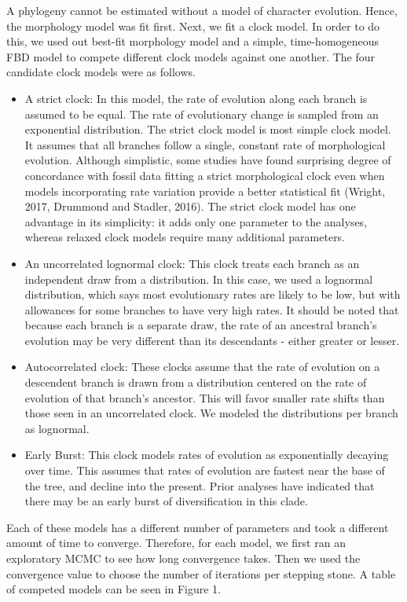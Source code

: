 \documentclass{article}
\begin{document}
A phylogeny cannot be estimated without a model of character evolution. 
Hence, the morphology model was fit first.
Next, we fit a clock model. 
In order to do this, we used out best-fit morphology model and a simple, time-homogeneous FBD model to compete different clock models against one another.
The four candidate clock models were as follows.
\begin{itemize}
    \item A strict clock: In this model, the rate of evolution along each branch is assumed to be equal. The rate of evolutionary change is sampled from an exponential distribution. 
    The strict clock model is most simple clock model. 
    It assumes that all branches follow a single, constant rate of morphological evolution. 
    Although simplistic, some studies have found surprising degree of concordance with fossil data fitting a strict morphological clock even when models incorporating rate variation provide a better statistical fit (Wright, 2017, Drummond and Stadler, 2016). 
    The strict clock model has one advantage in its simplicity: it adds only one parameter to the analyses, whereas relaxed clock models require many additional parameters.
    \item An uncorrelated lognormal clock: This clock treats each branch as an independent draw from a distribution.  
    In this case, we used a lognormal distribution, which says most evolutionary rates are likely to be low, but with allowances for some branches to have very high rates. 
    It should be noted that because each branch is a separate draw, the rate of an ancestral branch's evolution may be very different than its descendants - either greater or lesser.
    \item Autocorrelated clock: These clocks assume that the rate of evolution on a descendent branch is drawn from a distribution centered on the rate of evolution of that branch's ancestor. 
    This will favor smaller rate shifts than those seen in an uncorrelated clock. We modeled the distributions per branch as lognormal.
    \item Early Burst: This clock models rates of evolution as exponentially decaying over time. 
    This assumes that rates of evolution are fastest near the base of the tree, and decline into the present. Prior analyses have indicated that there may be an early burst of diversification in this clade. \citep{Pete, was this your idea?}
\end{itemize}

Each of these models has a different number of parameters and took a different amount of time to converge. Therefore, for each model, we first ran an exploratory MCMC to see how long convergence takes. Then we used the convergence value to choose the number of iterations per stepping stone.
A table of competed models can be seen in Figure 1.
\end{document}
